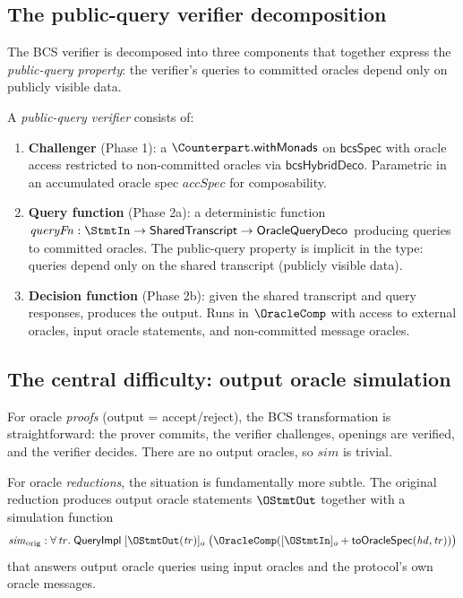 \subsection{The public-query verifier decomposition}

The BCS verifier is decomposed into three components that together express
the \emph{public-query property}: the verifier's queries to committed oracles
depend only on publicly visible data.

\begin{definition}[PublicQueryVerifier]
  \label{bcs:public-query-verifier}
  A \emph{public-query verifier} consists of:
  \begin{enumerate}
    \item \textbf{Challenger} (Phase 1): a $\Counterpart.\mathsf{withMonads}$
      on $\mathsf{bcsSpec}$ with oracle access restricted to non-committed
      oracles via $\mathsf{bcsHybridDeco}$.
      Parametric in an accumulated oracle spec $\mathit{accSpec}$
      for composability.
    \item \textbf{Query function} (Phase 2a): a deterministic function
      $\mathit{queryFn} : \StmtIn \to
      \mathsf{SharedTranscript} \to \mathsf{OracleQueryDeco}$
      producing queries to committed oracles.
      The public-query property is implicit in the type: queries depend
      only on the shared transcript (publicly visible data).
    \item \textbf{Decision function} (Phase 2b): given the shared transcript
      and query responses, produces the output.
      Runs in $\OracleComp$ with access to external oracles, input oracle
      statements, and non-committed message oracles.
  \end{enumerate}
\end{definition}

\subsection{The central difficulty: output oracle simulation}
\label{ssec:bcs-simulate}

For oracle \emph{proofs} (output = accept/reject), the BCS transformation
is straightforward: the prover commits, the verifier challenges, openings
are verified, and the verifier decides.
There are no output oracles, so $\mathit{sim}$ is trivial.

For oracle \emph{reductions}, the situation is fundamentally more subtle.
The original reduction produces output oracle statements $\OStmtOut$
together with a simulation function
\begin{equation}\label{eq:sim-orig}
  \mathit{sim}_{\mathrm{orig}} :
  \forall\,\mathit{tr}.\;
  \mathsf{QueryImpl}\;[\OStmtOut(\mathit{tr})]_o\;
  \bigl(\OracleComp([\OStmtIn]_o +
    \mathsf{toOracleSpec}(\mathit{hd}, \mathit{tr}))\bigr)
\end{equation}
that answers output oracle queries using input oracles and the
protocol's own oracle messages.

